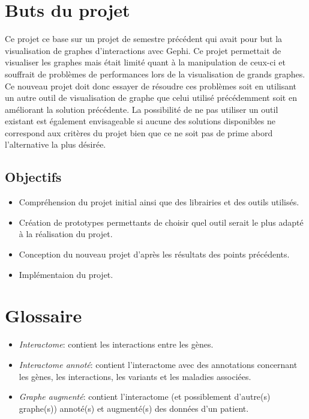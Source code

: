 \documentclass{article}
\begin{document}
\section{Buts du projet}
  Ce projet ce base sur un projet de semestre précédent qui avait pour but la visualisation de graphes d'interactions avec Gephi. Ce projet permettait de visualiser les graphes mais était limité quant à la manipulation de ceux-ci et souffrait de problèmes de performances lors de la visualisation de grands graphes.\\
  Ce nouveau projet doit donc essayer de résoudre ces problèmes soit en utilisant un autre outil de visualisation de graphe que celui utilisé précédemment soit en améliorant la solution précédente. La possibilité de ne pas utiliser un outil existant est également envisageable si aucune des solutions disponibles ne correspond aux critères du projet bien que ce ne soit pas de prime abord l'alternative la plus désirée.
  \subsection{Objectifs}
  \begin{itemize}
    \item Compréhension du projet initial ainsi que des librairies et des outils utilisés.
    \item Création de prototypes permettants de choisir quel outil serait le plus adapté à la réalisation du projet.
    \item Conception du nouveau projet d'après les résultats des points précédents.
    \item Implémentaion du projet.
  \end{itemize}

\section{Glossaire}
  \begin{itemize}
    \item \textit{Interactome}: contient les interactions entre les gènes.
    \item \textit{Interactome annoté}: contient l'interactome avec des annotations concernant les gènes, les interactions, les variants et les maladies associées.
    \item \textit{Graphe augmenté}: contient l'interactome (et possiblement d'autre(s) graphe(s)) annoté(s) et augmenté(s) des données d'un patient.
  \end{itemize}
\cite{Sisto:2014}
\end{document}

